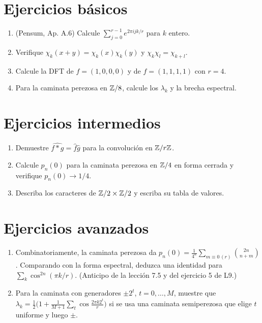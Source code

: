 \documentclass[11pt,a4paper]{article}
\begin{document}

\section{Ejercicios básicos}
\begin{enumerate}[label=\textbf{B\arabic*.}]
\item (Pensum, Ap. A.6) Calcule $\sum_{j=0}^{r-1}e^{2\pi ijk/r}$ para $k$ entero.
\item Verifique $\chi_k(x+y)=\chi_k(x)\chi_k(y)$ y $\chi_k\chi_l=\chi_{k+l}$.
\item Calcule la DFT de $f=(1,0,0,0)$ y de $f=(1,1,1,1)$ con $r=4$.
\item Para la caminata perezosa en $\mathbb{Z}/8$, calcule los $\lambda_k$ y la brecha espectral.
\end{enumerate}

\section{Ejercicios intermedios}
\begin{enumerate}[label=\textbf{I\arabic*.}]
\item Demuestre $\widehat{f*g}=\hat f\hat g$ para la convolución en $\mathbb{Z}/r\mathbb{Z}$.
\item Calcule $p_n(0)$ para la caminata perezosa en $\mathbb{Z}/4$ en forma cerrada y verifique $p_n(0)\to1/4$.
\item Describa los caracteres de $\mathbb{Z}/2\times\mathbb{Z}/2$ y escriba su tabla de valores.
\end{enumerate}

\section{Ejercicios avanzados}
\begin{enumerate}[label=\textbf{A\arabic*.}]
\item Combinatoriamente, la caminata perezosa da $p_n(0)=\frac1{4^n}\sum_{m\equiv0\,(r)}\binom{2n}{n+m}$. Comparando con la forma espectral, deduzca una identidad para $\sum_k\cos^{2n}(\pi k/r)$. (Anticipo de la lección 7.5 y del ejercicio 5 de L9.)
\item Para la caminata con generadores $\pm2^t$, $t=0,\dots,M$, muestre que $\lambda_k=\frac12\big(1+\frac1{M+1}\sum_t\cos\frac{2\pi k2^t}{r}\big)$ si se usa una caminata semiperezosa que elige $t$ uniforme y luego $\pm$.
\end{enumerate}
\end{document}
